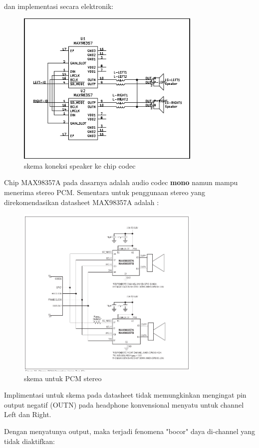 \documentclass[12pt,]{article}
\begin{document}
	dan implementasi secara elektronik:
	
	\begin{figure}[!ht]
		\centering
		\includegraphics[width=250pt]{images/skema_lrc}
		\caption{skema koneksi speaker ke chip codec}
	\end{figure}

	Chip MAX98357A pada dasarnya adalah audio codec \textbf{mono} namun mampu menerima stereo PCM.
	Sementara untuk penggunaan stereo yang direkomendasikan datasheet MAX98357A adalah \cite{Maxim}: 
	
	\begin{figure}[!ht]
		\centering
		\includegraphics[width=250pt]{images/stereo}
		\caption{skema untuk PCM stereo}
	\end{figure}

	Implimentasi untuk skema pada datasheet tidak memungkinkan mengingat pin output negatif (OUTN) pada headphone konvensional menyatu untuk channel Left dan Right.
	
	\newpage
	Dengan menyatunya output, maka terjadi fenomena "bocor" daya di-channel yang tidak diaktifkan:
	
\end{document}
